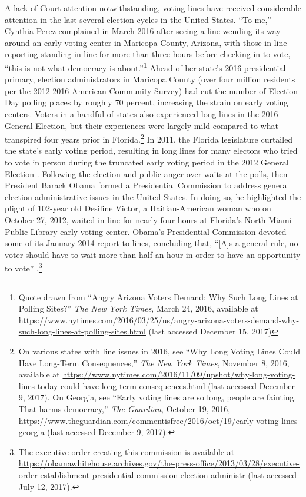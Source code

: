 \documentclass[12pt,titlepage]{article}
\begin{document}
A lack of Court attention notwithstanding, voting lines have received
considerable attention in the last several election cycles in the
United States.  ``To me,'' Cynthia Perez complained in March 2016
after seeing a line wending its way around an early voting center in
Maricopa County, Arizona, with those in line reporting standing in
line for more than three hours before checking in to vote, ``this is
not what democracy is about.''\footnote{Quote drawn from ``Angry
  Arizona Voters Demand: Why Such Long Lines at Polling Sites?''
  \emph{The New York Times}, March 24, 2016, available at
  \url{https://www.nytimes.com/2016/03/25/us/angry-arizona-voters-demand-why-such-long-lines-at-polling-sites.html}
  (last accessed December 15, 2017)} Ahead of her state's 2016
presidential primary, election administrators in Maricopa County (over
four million residents per the 2012-2016 American Community Survey)
had cut the number of Election Day polling places by roughly 70
percent, increasing the strain on early voting centers.  Voters in a
handful of states also experienced long lines in the 2016 General
Election, but their experiences were largely mild compared to what
transpired four years prior in Florida.\footnote{On various states
  with line issues in 2016, see ``Why Long Voting Lines Could Have
  Long-Term Consequences,'' \emph{The New York Times}, November 8,
  2016, available at
  \url{https://www.nytimes.com/2016/11/09/upshot/why-long-voting-lines-today-could-have-long-term-consequences.html}
  (last accessed December 9, 2017).  On Georgia, see ``Early voting
  lines are so long, people are fainting. That harms democracy,''
  \emph{The Guardian}, October 19, 2016,
  \url{https://www.theguardian.com/commentisfree/2016/oct/19/early-voting-lines-georgia}
  (last accessed December 9, 2017).} In 2011, the Florida legislature
curtailed the state's early voting period, resulting in long lines for
many electors who tried to vote in person during the truncated early
voting period in the 2012 General Election
\citep{herron_smith2014}. Following the election and public anger over
waits at the polls, then-President Barack Obama formed a Presidential
Commission to address general election administrative issues in the
United States. In doing so, he highlighted the plight of 102-year old
Desiline Victor, a Haitian-American woman who on October 27, 2012,
waited in line for nearly four hours at Florida's North Miami Public
Library early voting center. Obama's Presidential Commission devoted
some of its January 2014 report to lines, concluding that, ``[A]s a
general rule, no voter should have to wait more than half an hour in
order to have an opportunity to vote'' \citep[p.\
13,][]{pcea:2014}.\footnote{The executive order creating this
  commission is available at
  \url{https://obamawhitehouse.archives.gov/the-press-office/2013/03/28/executive-order-establishment-presidential-commission-election-administr}
  (last accessed July 12, 2017).}
\end{document}
